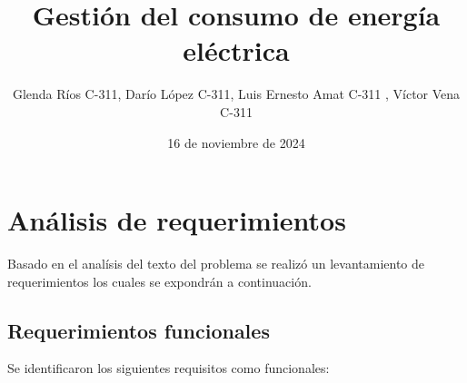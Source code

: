 \documentclass{article}
\title{Gestión del consumo de energía eléctrica}
\author{Glenda Ríos C-311, Darío López C-311, Luis Ernesto Amat C-311 , Víctor Vena C-311}
\date{16 de noviembre de 2024}
\begin{document}
\maketitle

\section{Análisis de requerimientos}
Basado en el analísis del texto del problema se realizó un levantamiento de requerimientos  los cuales se expondrán a continuación.

\subsection{Requerimientos funcionales}

Se identificaron los siguientes requisitos como funcionales:
\end{document}
